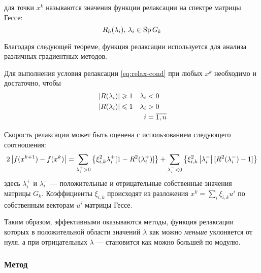 \begin{dfn}
   для точки $x^k$ называются значения
  функции релаксации на спектре матрицы Гессе:
  \begin{equation}
    \label{eq:relax-fac}
    R_h(\lambda_i),\, \lambda_i \in \operatorname{Sp}{G_k}
  \end{equation}
\end{dfn}

Благодаря следующей теореме, функция релаксации используется для
анализа различных градиентных методов.

\begin{thm}
  \label{thm:relax-thm}
  Для выполнения условия релаксации \eqref{eq:relax-cond} при любых
  $x^k$ необходимо и достаточно, чтобы
  \begin{equation}
    \label{eq:relax-thm}
    \begin{aligned}
      & \left \lvert{R(\lambda_i)}\right \rvert \geqslant 1 & \lambda_i& < 0 \\
      & \left \lvert{R(\lambda_i)}\right \rvert \leqslant 1 & \lambda_i& > 0\\
      &&i& = \overline{1, n}
    \end{aligned}
  \end{equation}
\end{thm}



Скорость релаксации может быть оценена с использованием следующего
соотношения:
\begin{equation}
  \label{eq:relax-speed}
  2\left \lvert{f(x^{k+1})-f(x^k)}\right \rvert=\sum_{\lambda_i^+>0} \left\{\xi_{i,k}^2
    \lambda_i^+ [1-R^2(\lambda_i^+)]\right\} + \sum_{\lambda_i^-<0} \left\{\xi_{i,k}^2
    \left \lvert{\lambda_i^-}\right \rvert [R^2(\lambda_i^-)-1]\right\}
\end{equation}
здесь $\lambda_i^+$ и $\lambda_i^-$ — положительные и отрицательные
собственные значения матрицы $G_k$. Коэффициенты $\xi_{i,k}$
происходят из разложения $x^k=\sum_i{\xi_{i,k}u^i}$ по собственным
векторам $u^i$ матрицы Гессе.

Таким образом, эффективными оказываются методы, функция релаксации
которых в положительной области значений $\lambda$ как можно
\emph{меньше} уклоняется от нуля, а при отрицательных $\lambda$ —
становится как можно большей по модулю.

\subsubsection{Метод \gd{}}
\label{sec:gd}

